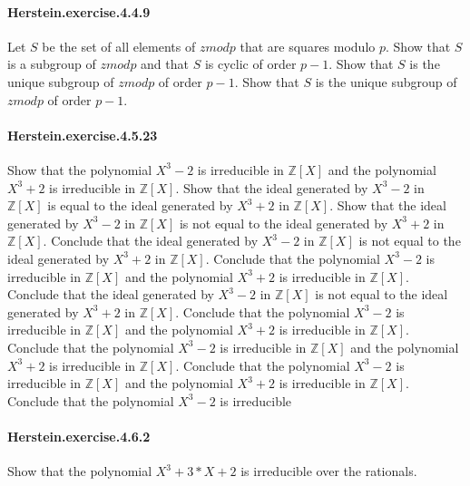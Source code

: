 \documentclass{article}
\begin{document}

\paragraph{Herstein.exercise.4.4.9} Let $S$ be the set of all elements of $zmod p$ that are squares modulo $p$. Show that $S$ is a subgroup of $zmod p$ and that $S$ is cyclic of order $p-1$. Show that $S$ is the unique subgroup of $zmod p$ of order $p-1$. Show that $S$ is the unique subgroup of $zmod p$ of order $p-1$.

\paragraph{Herstein.exercise.4.5.23} Show that the polynomial $X^3 - 2$ is irreducible in $\mathbb{Z}[X]$ and the polynomial $X^3 + 2$ is irreducible in $\mathbb{Z}[X]$. Show that the ideal generated by $X^3 - 2$ in $\mathbb{Z}[X]$ is equal to the ideal generated by $X^3 + 2$ in $\mathbb{Z}[X]$. Show that the ideal generated by $X^3 - 2$ in $\mathbb{Z}[X]$ is not equal to the ideal generated by $X^3 + 2$ in $\mathbb{Z}[X]$. Conclude that the ideal generated by $X^3 - 2$ in $\mathbb{Z}[X]$ is not equal to the ideal generated by $X^3 + 2$ in $\mathbb{Z}[X]$. Conclude that the polynomial $X^3 - 2$ is irreducible in $\mathbb{Z}[X]$ and the polynomial $X^3 + 2$ is irreducible in $\mathbb{Z}[X]$. Conclude that the ideal generated by $X^3 - 2$ in $\mathbb{Z}[X]$ is not equal to the ideal generated by $X^3 + 2$ in $\mathbb{Z}[X]$. Conclude that the polynomial $X^3 - 2$ is irreducible in $\mathbb{Z}[X]$ and the polynomial $X^3 + 2$ is irreducible in $\mathbb{Z}[X]$. Conclude that the polynomial $X^3 - 2$ is irreducible in $\mathbb{Z}[X]$ and the polynomial $X^3 + 2$ is irreducible in $\mathbb{Z}[X]$. Conclude that the polynomial $X^3 - 2$ is irreducible in $\mathbb{Z}[X]$ and the polynomial $X^3 + 2$ is irreducible in $\mathbb{Z}[X]$. Conclude that the polynomial $X^3 - 2$ is irreducible

\paragraph{Herstein.exercise.4.6.2} Show that the polynomial $X^3 + 3*X + 2$ is irreducible over the rationals.
\end{document}
